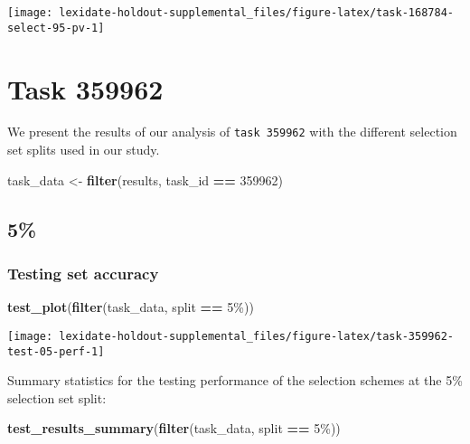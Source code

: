 \documentclass[
]{book}
\newenvironment{Shaded}{\begin{snugshade}}{\end{snugshade}}
\newcommand{\DecValTok}[1]{\textcolor[rgb]{0.00,0.00,0.81}{#1}}
\newcommand{\FunctionTok}[1]{\textcolor[rgb]{0.13,0.29,0.53}{\textbf{#1}}}
\newcommand{\NormalTok}[1]{#1}
\newcommand{\OtherTok}[1]{\textcolor[rgb]{0.56,0.35,0.01}{#1}}
\newcommand{\SpecialCharTok}[1]{\textcolor[rgb]{0.81,0.36,0.00}{\textbf{#1}}}
\newcommand{\StringTok}[1]{\textcolor[rgb]{0.31,0.60,0.02}{#1}}
\begin{document}
\texttt{[image: lexidate-holdout-supplemental\_files/figure-latex/task-168784-select-95-pv-1]}

\hypertarget{task-359962}{%
\chapter{Task 359962}\label{task-359962}}

We present the results of our analysis of \texttt{task\ 359962} with the different selection set splits used in our study.

\begin{Shaded}
\begin{Highlighting}[]
\NormalTok{task\_data }\OtherTok{\textless{}{-}} \FunctionTok{filter}\NormalTok{(results, task\_id }\SpecialCharTok{==} \DecValTok{359962}\NormalTok{)}
\end{Highlighting}
\end{Shaded}

\hypertarget{section-55}{%
\section{5\%}\label{section-55}}

\hypertarget{testing-set-accuracy-55}{%
\subsection{Testing set accuracy}\label{testing-set-accuracy-55}}

\begin{Shaded}
\begin{Highlighting}[]
\FunctionTok{test\_plot}\NormalTok{(}\FunctionTok{filter}\NormalTok{(task\_data, split }\SpecialCharTok{==} \StringTok{\textquotesingle{}5\%\textquotesingle{}}\NormalTok{))}
\end{Highlighting}
\end{Shaded}

\texttt{[image: lexidate-holdout-supplemental\_files/figure-latex/task-359962-test-05-perf-1]}

Summary statistics for the testing performance of the selection schemes at the 5\% selection set split:

\begin{Shaded}
\begin{Highlighting}[]
\FunctionTok{test\_results\_summary}\NormalTok{(}\FunctionTok{filter}\NormalTok{(task\_data, split }\SpecialCharTok{==} \StringTok{\textquotesingle{}5\%\textquotesingle{}}\NormalTok{))}
\end{Highlighting}
\end{Shaded}
\end{document}
